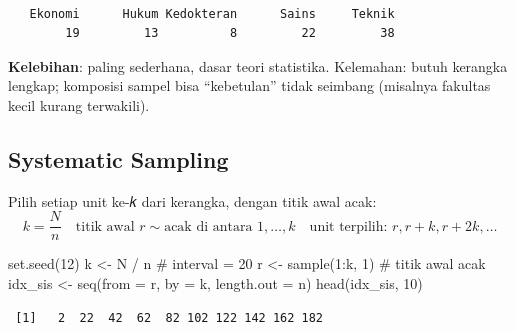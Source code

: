 \documentclass[
  indonesian,
  letterpaper,
]{book}
\newenvironment{Shaded}{\begin{snugshade}}{\end{snugshade}}
\newcommand{\AttributeTok}[1]{\textcolor[rgb]{0.40,0.45,0.13}{#1}}
\newcommand{\CommentTok}[1]{\textcolor[rgb]{0.37,0.37,0.37}{#1}}
\newcommand{\DecValTok}[1]{\textcolor[rgb]{0.68,0.00,0.00}{#1}}
\newcommand{\FunctionTok}[1]{\textcolor[rgb]{0.28,0.35,0.67}{#1}}
\newcommand{\NormalTok}[1]{\textcolor[rgb]{0.00,0.23,0.31}{#1}}
\newcommand{\OtherTok}[1]{\textcolor[rgb]{0.00,0.23,0.31}{#1}}
\newcommand{\SpecialCharTok}[1]{\textcolor[rgb]{0.37,0.37,0.37}{#1}}
\begin{document}
\begin{Shaded}
\end{Shaded}

\begin{verbatim}

   Ekonomi      Hukum Kedokteran      Sains     Teknik 
        19         13          8         22         38 
\end{verbatim}

\textbf{Kelebihan}: paling sederhana, dasar teori statistika. Kelemahan:
butuh kerangka lengkap; komposisi sampel bisa ``kebetulan'' tidak
seimbang (misalnya fakultas kecil kurang terwakili).

\subsection{Systematic Sampling}\label{systematic-sampling}

Pilih setiap unit ke-𝑘 dari kerangka, dengan titik awal acak:
\[k = \frac{N}{n} \quad \text{titik awal } r \sim \text{acak di antara } 1, \dots, k \quad \text{unit terpilih: } r, r+k, r+2k, \dots\]

\begin{Shaded}
\begin{Highlighting}[]
\FunctionTok{set.seed}\NormalTok{(}\DecValTok{12}\NormalTok{)}
\NormalTok{k }\OtherTok{\textless{}{-}}\NormalTok{ N }\SpecialCharTok{/}\NormalTok{ n }\CommentTok{\# interval = 20}
\NormalTok{r }\OtherTok{\textless{}{-}} \FunctionTok{sample}\NormalTok{(}\DecValTok{1}\SpecialCharTok{:}\NormalTok{k, }\DecValTok{1}\NormalTok{) }\CommentTok{\# titik awal acak}
\NormalTok{idx\_sis }\OtherTok{\textless{}{-}} \FunctionTok{seq}\NormalTok{(}\AttributeTok{from =}\NormalTok{ r, }\AttributeTok{by =}\NormalTok{ k, }\AttributeTok{length.out =}\NormalTok{ n)}
\FunctionTok{head}\NormalTok{(idx\_sis, }\DecValTok{10}\NormalTok{)}
\end{Highlighting}
\end{Shaded}

\begin{verbatim}
 [1]   2  22  42  62  82 102 122 142 162 182
\end{verbatim}

\begin{Shaded}
\end{Shaded}
\end{document}

